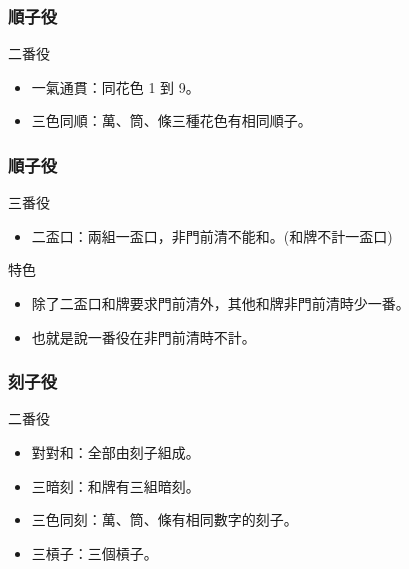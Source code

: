 \documentclass[utf8]{beamer}
\begin{document}
\begin{CJK}{UTF8}{bkai}
\begin{frame}
  \frametitle{順子役}
  \begin{block}{二番役}
    \begin{itemize}
    \item 一氣通貫：同花色 1 到 9。
      \begin{figure}
        \centering
        \Tong{}\Xi
      \end{figure}
    \item 三色同順：萬、筒、條三種花色有相同順子。
      \begin{figure}
        \centering
        \Nan\Nan{}
      \end{figure}
    \end{itemize}
  \end{block}
\end{frame}

\begin{frame}
  \frametitle{順子役}
  \begin{alertblock}{三番役}
    \begin{itemize}
    \item 二盃口：兩組一盃口，\alert{非門前清不能和}。(和牌不計一盃口)
      \begin{figure}
        \centering
        \Fa
      \end{figure}
    \end{itemize}
  \end{alertblock}
  \begin{exampleblock}{特色}
    \begin{itemize}
    \item 除了二盃口和牌要求門前清外，其他和牌\alert{非門前清時少一番}。
    \item 也就是說一番役在非門前清時\alert{不計}。
    \end{itemize}
  \end{exampleblock}
\end{frame}

\begin{frame}
  \frametitle{刻子役}
  \begin{block}{二番役}
    \begin{itemize}
    \item 對對和：全部由刻子組成。
    \item 三暗刻：和牌有三組暗刻。
    \item 三色同刻：萬、筒、條有相同數字的刻子。
    \item 三槓子：三個槓子。
    \end{itemize}
  \end{block}
\end{frame}


\end{CJK}
\end{document}
